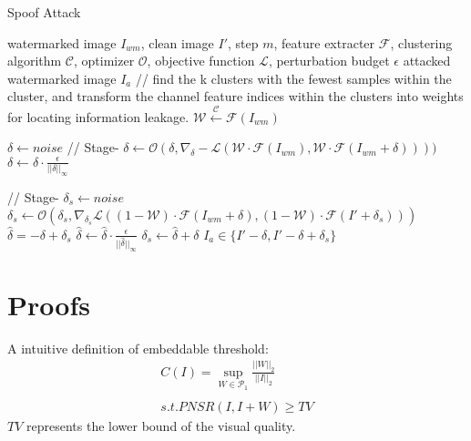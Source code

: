\begin{algorithm}[tb]
   \caption{Spoof Attack}
   \label{alg:spoof algo}
\begin{algorithmic}
    watermarked image $I_{wm}$,  clean image $I'$, step $m$, feature extracter $\mathcal{F}$, clustering algorithm $\mathcal{C}$, optimizer $\mathcal{O}$, objective function $\mathcal{L}$, perturbation budget $\epsilon$
    attacked watermarked image $I_a$
   \STATE // find the k clusters with the fewest samples within the cluster, and transform the channel feature indices within the clusters into weights for locating information leakage.
   \STATE $\mathcal{W} \xleftarrow{\mathcal{C}} \mathcal{F}(I_{wm})$ 
  
   
   \STATE $\delta \xleftarrow{} noise$
   \STATE // Stage-\uppercase\expandafter{}
   \STATE $\delta \xleftarrow{} \mathcal{O}(\delta,\nabla_\delta-\mathcal{L}(\mathcal{W} \cdot \mathcal{F}(I_{wm}), \mathcal{W}\cdot \mathcal{F}(I_{wm} + \delta))))$
   \IF{$||\delta||_\infty > \epsilon$}
   \STATE  $\delta \xleftarrow{} \delta \cdot \frac{\epsilon}{||\delta||_\infty}$
   \ENDIF
   \ENDFOR
    
   \STATE // Stage-\uppercase\expandafter{}
   \STATE $\delta_s \xleftarrow{} noise$
   \STATE $\delta_s \xleftarrow{} \mathcal{O}(\delta_s,\nabla_{\delta_s}\mathcal{L}((1-\mathcal{W}) \cdot \mathcal{F}(I_{wm}+\delta), (1-\mathcal{W})\cdot \mathcal{F}(I' + \delta_s)))$
   \STATE $\hat{\delta}=-\delta + \delta_s$
   \IF{$||\hat{\delta}||_\infty > \epsilon$}
   \STATE  $\hat{\delta} \xleftarrow{} \hat{\delta} \cdot \frac{\epsilon}{||\hat{\delta}||_\infty}$
   \STATE $\delta_s \xleftarrow{} \hat{\delta} + \delta$
   \ENDIF
   \ENDFOR
    $I_a \in \{I' - \delta, I'-\delta+\delta_s\}$
\end{algorithmic}
\end{algorithm}

\section{Proofs}\label{sec:Appendix_Proofs}

\begin{definition}
A intuitive definition of embeddable threshold:
\begin{gather*}
C(I) = \sup_{W \in \mathcal{P}_1}{\frac{||W||_2}{||I||_2}} \\\\
s.t. PNSR(I, I+W) \ge TV
\end{gather*}
$TV$ represents the lower bound of the visual quality.
\end{definition}

